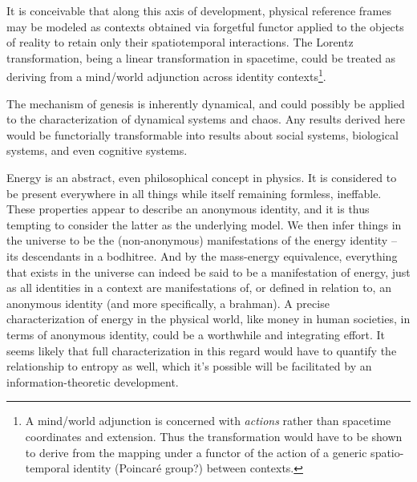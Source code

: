 \documentclass[pra,twocolumn,groupedaddress,10pt]{revtex4}
\theoremstyle{definition}
\begin{document}
It is conceivable that along this axis of development, physical reference frames may be modeled as contexts obtained via forgetful functor applied to the objects of reality to retain only their spatiotemporal interactions. The Lorentz transformation, being a linear transformation in spacetime, could be treated as deriving from a mind/world adjunction across identity contexts\footnote{A mind/world adjunction is concerned with \emph{actions} rather than spacetime coordinates and extension. Thus the transformation would have to be shown to derive from the mapping under a functor of the action of a generic spatio-temporal identity (Poincar\'{e} group?) between contexts.}.

The mechanism of genesis is inherently dynamical, and could possibly be applied to the characterization of dynamical systems and chaos. Any results derived here would be functorially transformable into results about social systems, biological systems, and even cognitive systems.

Energy is an abstract, even philosophical concept in physics. It is considered to be present everywhere in all things while itself remaining formless, ineffable. These properties appear to describe an anonymous identity, and it is thus tempting to consider the latter as the underlying model. We then infer things in the universe to be the (non-anonymous) manifestations of the energy identity -- its descendants in a bodhitree. And by the mass-energy equivalence, everything that exists in the universe can indeed be said to be a manifestation of energy, just as all identities in a context are manifestations of, or defined in relation to, an anonymous identity (and more specifically, a brahman). A precise characterization of energy in the physical world, like money in human societies, in terms of anonymous identity, could be a worthwhile and integrating effort. It seems likely that full characterization in this regard would have to quantify the relationship to entropy as well, which it's possible will be facilitated by an information-theoretic development.
\end{document}
